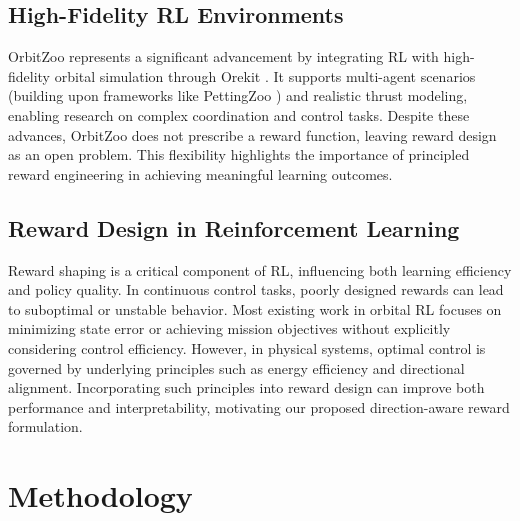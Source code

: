 \documentclass[paper]{ieice}
\begin{document}
\subsection{High-Fidelity RL Environments}
OrbitZoo represents a significant advancement by integrating RL with high-fidelity orbital simulation through Orekit \cite{orekit}. It supports multi-agent scenarios (building upon frameworks like PettingZoo \cite{terry2021pettingzoo}) and realistic thrust modeling, enabling research on complex coordination and control tasks. Despite these advances, OrbitZoo does not prescribe a reward function, leaving reward design as an open problem. This flexibility highlights the importance of principled reward engineering in achieving meaningful learning outcomes.

\subsection{Reward Design in Reinforcement Learning}
Reward shaping is a critical component of RL, influencing both learning efficiency and policy quality. In continuous control tasks, poorly designed rewards can lead to suboptimal or unstable behavior. Most existing work in orbital RL focuses on minimizing state error or achieving mission objectives without explicitly considering control efficiency. However, in physical systems, optimal control is governed by underlying principles such as energy efficiency and directional alignment. Incorporating such principles into reward design can improve both performance and interpretability, motivating our proposed direction-aware reward formulation.

\section{Methodology}
\label{Methodology}
\end{document}
